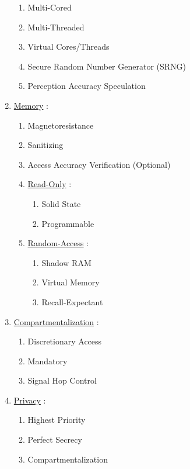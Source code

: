 \documentclass[11pt]{article}
\begin{document}
\begin{enumerate}
\begin{enumerate}
		\item[] Multi-Cored
		\item[] Multi-Threaded
		\item[] Virtual Cores/Threads
		\item[] Secure Random Number Generator (SRNG)
		\item[] Perception Accuracy Speculation
		
	\end{enumerate}
	
	\item[] \ul{Memory} :
	\begin{enumerate}
		\item[] Magnetoresistance
		\item[] Sanitizing
		\item[] Access Accuracy Verification (Optional)
		
		\item[] \ul{Read-Only} :
		\begin{enumerate}
			\item[] Solid State
			\item[] Programmable
		\end{enumerate}
	
		\item[] \ul{Random-Access} :
		\begin{enumerate}
			\item[] Shadow RAM
			\item[] Virtual Memory
			\item[] Recall-Expectant
		\end{enumerate}
		
	\end{enumerate}

	\item[] \ul{Compartmentalization} :
	\begin{enumerate}
		\item[] Discretionary Access
		\item[] Mandatory
		\item[] Signal Hop Control
	\end{enumerate}

	\item[] \ul{Privacy} :
	\begin{enumerate}
		\item[] Highest Priority
		\item[] Perfect Secrecy
		\item[] Compartmentalization
	\end{enumerate}
	
\end{enumerate}
\end{document}
